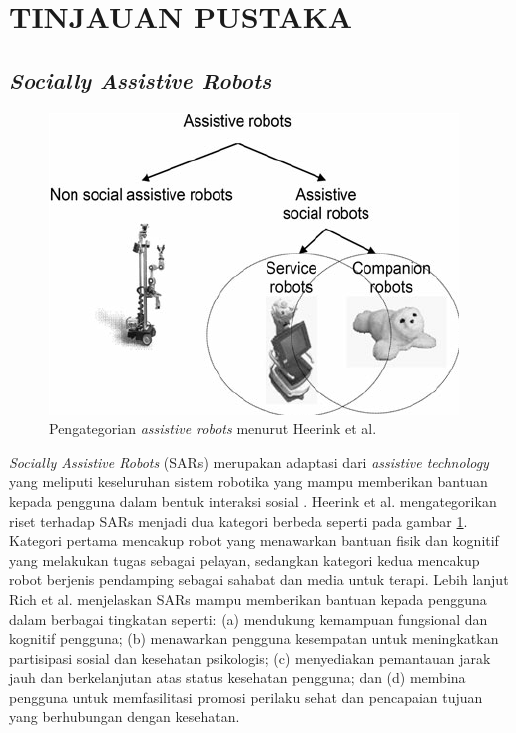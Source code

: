 \section{TINJAUAN PUSTAKA}

\subsection{\emph{Socially Assistive Robots}}

\begin{figure} [ht] \centering
	\includegraphics[scale=0.45]{gambar/robots-category.png}
	\caption{Pengategorian \emph{assistive robots} menurut Heerink et al.}
	\label{fig:RobotsCategory}
\end{figure}

\emph{Socially Assistive Robots} (SARs) merupakan adaptasi dari \emph{assistive technology} yang meliputi keseluruhan sistem robotika yang mampu memberikan bantuan kepada pengguna dalam bentuk interaksi sosial \citep{Seifer2005}.
Heerink et al. \citep{Heerink2010} mengategorikan riset terhadap SARs menjadi dua kategori berbeda seperti pada gambar \ref{fig:RobotsCategory}.
Kategori pertama mencakup robot yang menawarkan bantuan fisik dan kognitif yang melakukan tugas sebagai pelayan, sedangkan kategori kedua mencakup robot berjenis pendamping sebagai sahabat dan media untuk terapi.
Lebih lanjut Rich et al. \citep{Rich2009} menjelaskan SARs mampu memberikan bantuan kepada pengguna dalam berbagai tingkatan seperti:
(a) mendukung kemampuan fungsional dan kognitif pengguna;
(b) menawarkan pengguna kesempatan untuk meningkatkan partisipasi sosial dan kesehatan psikologis;
(c) menyediakan pemantauan jarak jauh dan berkelanjutan atas status kesehatan pengguna;
dan (d) membina pengguna untuk memfasilitasi promosi perilaku sehat dan pencapaian tujuan yang berhubungan dengan kesehatan.

